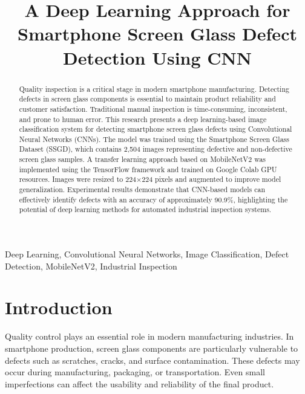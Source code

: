 \documentclass[conference]{IEEEtran}
\begin{document}
\title{A Deep Learning Approach for Smartphone Screen Glass Defect Detection Using CNN}

\author{
}

\maketitle

\begin{abstract}
Quality inspection is a critical stage in modern smartphone manufacturing. Detecting defects in screen glass components is essential to maintain product reliability and customer satisfaction. Traditional manual inspection is time-consuming, inconsistent, and prone to human error. This research presents a deep learning-based image classification system for detecting smartphone screen glass defects using Convolutional Neural Networks (CNNs). The model was trained using the Smartphone Screen Glass Dataset (SSGD), which contains 2,504 images representing defective and non-defective screen glass samples. A transfer learning approach based on MobileNetV2 was implemented using the TensorFlow framework and trained on Google Colab GPU resources. Images were resized to 224×224 pixels and augmented to improve model generalization. Experimental results demonstrate that CNN-based models can effectively identify defects with an accuracy of approximately 90.9\%, highlighting the potential of deep learning methods for automated industrial inspection systems.
\end{abstract}

\begin{IEEEkeywords}
Deep Learning, Convolutional Neural Networks, Image Classification, Defect Detection, MobileNetV2, Industrial Inspection
\end{IEEEkeywords}

\section{Introduction}

Quality control plays an essential role in modern manufacturing industries. In smartphone production, screen glass components are particularly vulnerable to defects such as scratches, cracks, and surface contamination. These defects may occur during manufacturing, packaging, or transportation. Even small imperfections can affect the usability and reliability of the final product.
\end{document}
